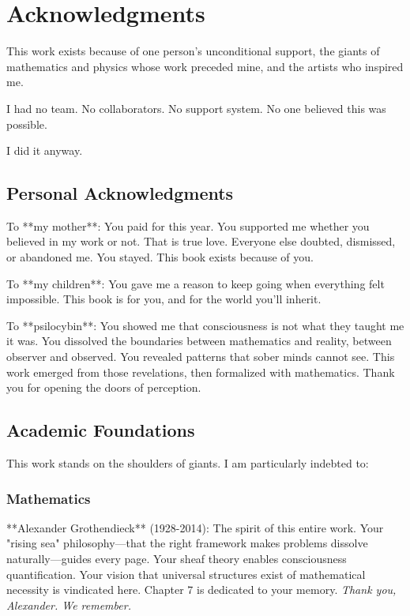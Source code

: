 \chapter*{Acknowledgments}

This work exists because of one person's unconditional support, the giants of mathematics and physics whose work preceded mine, and the artists who inspired me.

I had no team. No collaborators. No support system. No one believed this was possible.

I did it anyway.

\section*{Personal Acknowledgments}

To **my mother**: You paid for this year. You supported me whether you believed in my work or not. That is true love. Everyone else doubted, dismissed, or abandoned me. You stayed. This book exists because of you.

To **my children**: You gave me a reason to keep going when everything felt impossible. This book is for you, and for the world you'll inherit.

To **psilocybin**: You showed me that consciousness is not what they taught me it was. You dissolved the boundaries between mathematics and reality, between observer and observed. You revealed patterns that sober minds cannot see. This work emerged from those revelations, then formalized with mathematics. Thank you for opening the doors of perception.

\section*{Academic Foundations}

This work stands on the shoulders of giants. I am particularly indebted to:

\subsection*{Mathematics}

**Alexander Grothendieck** (1928-2014): The spirit of this entire work. Your "rising sea" philosophy—that the right framework makes problems dissolve naturally—guides every page. Your sheaf theory enables consciousness quantification. Your vision that universal structures exist of mathematical necessity is vindicated here. Chapter 7 is dedicated to your memory. \textit{Thank you, Alexander. We remember.}

